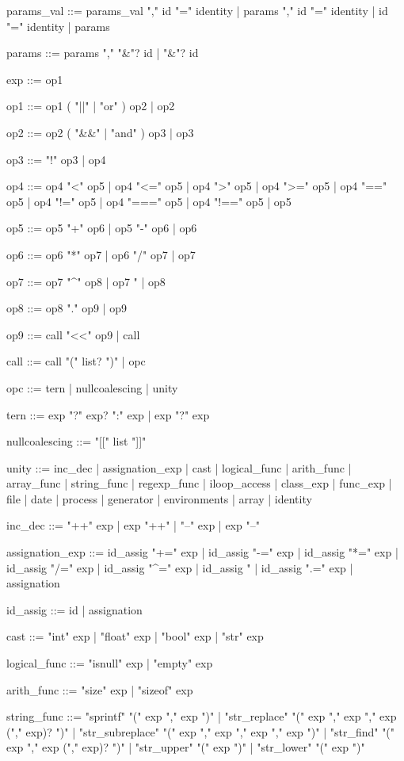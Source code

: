 params_val ::= params_val "," id "=" identity 
   |  params "," id "=" identity 
   |  id "=" identity 
   |  params
   
params ::= params "," "&"? id
   |  "&"? id

exp ::= op1


op1 ::= op1 ( "||" | "or" ) op2
   |  op2

op2 ::= op2 ( "&&" | "and" ) op3
   |  op3

op3 ::= "!" op3 
   |  op4

op4 ::= op4 "<" op5
   |  op4 "<=" op5
   |  op4 ">" op5
   |  op4 ">=" op5
   |  op4 "==" op5
   |  op4 "!=" op5
   |  op4 "===" op5
   |  op4 "!==" op5
   |  op5

op5 ::= op5 "+" op6
   |  op5  "-" op6
   |  op6
   
op6  ::= op6 "*" op7
   |  op6 "/" op7
   |  op7
   
op7  ::= op7 "^" op8
   |  op7 "%
   |  op8

op8 ::=  op8 "." op9
   |  op9

op9  ::= call "<<" op9
   |  call
   
call ::= call "(" list? ")"
   |  opc
   
opc ::= tern
   |  nullcoalescing
   |  unity
   
tern ::= exp "?" exp? ":" exp
   |  exp "?" exp
   
nullcoalescing ::= "[[" list "]]"

unity ::= inc_dec
   |  assignation_exp
   |  cast
   |  logical_func
   |  arith_func
   |  array_func
   |  string_func
   |  regexp_func
   |  iloop_access
   |  class_exp
   |  func_exp
   |  file
   |  date
   |  process
   |  generator
   |  environments
   |  array
   |  identity
   
inc_dec ::= "++" exp
   |  exp "++"
   |  "--" exp
   |  exp "--"
   
assignation_exp ::= id_assig "+=" exp
   |  id_assig "-=" exp
   |  id_assig "*=" exp
   |  id_assig "/=" exp
   |  id_assig "^=" exp
   |  id_assig "%
   |  id_assig ".=" exp
   |  assignation
   
id_assig ::= id
   | assignation
   
cast ::= "int" exp
   | "float" exp
   |  "bool" exp
   |  "str" exp

logical_func ::= "isnull" exp
   |  "empty" exp
   
arith_func ::= "size" exp
   |  "sizeof" exp
   
string_func ::= "sprintf" "(" exp "," exp ")"
   |  "str_replace" "(" exp "," exp "," exp ("," exp)? ")"
   |  "str_subreplace" "(" exp "," exp "," exp "," exp ")"
   |  "str_find" "(" exp "," exp ("," exp)? ")"
   |  "str_upper" "(" exp ")"
   |  "str_lower" "(" exp ")"
   
